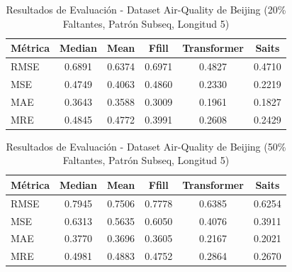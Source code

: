 \begin{table}[htbp]
\centering
\caption{Resultados de Evaluación - Dataset Air-Quality de Beijing (20\% Faltantes, Patrón Subseq, Longitud 5)}
\label{tab:resultados_pekin_eval_20_subseq_5}
\begin{tabular}{l*{5}{S[table-format=1.4]}}
\toprule
\textbf{Métrica} & \textbf{Median} & \textbf{Mean} & \textbf{Ffill} & \textbf{Transformer} & \textbf{Saits} \\
\midrule
RMSE & 0.6891 & 0.6374 & 0.6971 & 0.4827 & 0.4710 \\
MSE  & 0.4749 & 0.4063 & 0.4860 & 0.2330 & 0.2219 \\
MAE  & 0.3643 & 0.3588 & 0.3009 & 0.1961 & 0.1827 \\
MRE  & 0.4845 & 0.4772 & 0.3991 & 0.2608 & 0.2429 \\
\bottomrule
\end{tabular}
\end{table}

\begin{table}[htbp]
\centering
\caption{Resultados de Evaluación - Dataset Air-Quality de Beijing (50\% Faltantes, Patrón Subseq, Longitud 5)}
\label{tab:resultados_pekin_eval_50_subseq_5}
\begin{tabular}{l*{5}{S[table-format=1.4]}}
\toprule
\textbf{Métrica} & \textbf{Median} & \textbf{Mean} & \textbf{Ffill} & \textbf{Transformer} & \textbf{Saits} \\
\midrule
RMSE & 0.7945 & 0.7506 & 0.7778 & 0.6385 & 0.6254 \\
MSE  & 0.6313 & 0.5635 & 0.6050 & 0.4076 & 0.3911 \\
MAE  & 0.3770 & 0.3696 & 0.3605 & 0.2167 & 0.2021 \\
MRE  & 0.4981 & 0.4883 & 0.4752 & 0.2864 & 0.2670 \\
\bottomrule
\end{tabular}
\end{table}